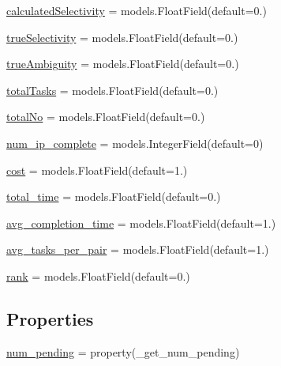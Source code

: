 \begin{DoxyCompactItemize}
\item 
\mbox{\hyperlink{classdynamicfilterapp_1_1models_1_1_predicate_a188ea6f444715e91f6b9e0860893ed16}{calculated\+Selectivity}} = models.\+Float\+Field(default=0.)
\item 
\mbox{\hyperlink{classdynamicfilterapp_1_1models_1_1_predicate_ad83f72684951b87b2dc27c4e469b2bb5}{true\+Selectivity}} = models.\+Float\+Field(default=0.)
\item 
\mbox{\hyperlink{classdynamicfilterapp_1_1models_1_1_predicate_ac6b5e98e5c2a0c3bbb3ff3e84ed67248}{true\+Ambiguity}} = models.\+Float\+Field(default=0.)
\item 
\mbox{\hyperlink{classdynamicfilterapp_1_1models_1_1_predicate_a21e1aac4555eeb991df1ae938abbcfd8}{total\+Tasks}} = models.\+Float\+Field(default=0.)
\item 
\mbox{\hyperlink{classdynamicfilterapp_1_1models_1_1_predicate_a4dc8ddca0ad5a5c301c4ad4245ba4466}{total\+No}} = models.\+Float\+Field(default=0.)
\item 
\mbox{\hyperlink{classdynamicfilterapp_1_1models_1_1_predicate_a6cd98dfddbfd6b4ac23a1db75792da3c}{num\+\_\+ip\+\_\+complete}} = models.\+Integer\+Field(default=0)
\item 
\mbox{\hyperlink{classdynamicfilterapp_1_1models_1_1_predicate_a6ce3360f2586a441b79b1053cfd2769c}{cost}} = models.\+Float\+Field(default=1.)
\item 
\mbox{\hyperlink{classdynamicfilterapp_1_1models_1_1_predicate_ae4ca52b9abe06f0013a84e7b33cf30ff}{total\+\_\+time}} = models.\+Float\+Field(default=0.)
\item 
\mbox{\hyperlink{classdynamicfilterapp_1_1models_1_1_predicate_a2f52b3007bbd1aa958220863bec30b0e}{avg\+\_\+completion\+\_\+time}} = models.\+Float\+Field(default=1.)
\item 
\mbox{\hyperlink{classdynamicfilterapp_1_1models_1_1_predicate_a6d5659d7cb67dfb46915ea0ff9c3d0e5}{avg\+\_\+tasks\+\_\+per\+\_\+pair}} = models.\+Float\+Field(default=1.)
\item 
\mbox{\hyperlink{classdynamicfilterapp_1_1models_1_1_predicate_aab463cca26e853227a05587642f8e578}{rank}} = models.\+Float\+Field(default=0.)
\end{DoxyCompactItemize}
\subsection*{Properties}
\begin{DoxyCompactItemize}
\item 
\mbox{\hyperlink{classdynamicfilterapp_1_1models_1_1_predicate_a098558b4669412bf8a4958680b5ea760}{num\+\_\+pending}} = property(\+\_\+get\+\_\+num\+\_\+pending)
\end{DoxyCompactItemize}


